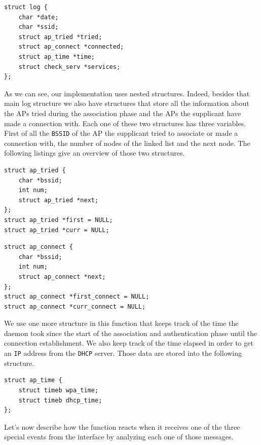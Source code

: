 \begin{lstlisting}[frame=single,breaklines=true,caption={Log structure}]
struct log {
	char *date;
	char *ssid;
	struct ap_tried *tried;
	struct ap_connect *connected;
	struct ap_time *time;
	struct check_serv *services;
};
\end{lstlisting}

As we can see, our implementation uses nested structures. Indeed, besides that main log structure we also have structures that store all the information about the APs tried during the association phase and the APs the supplicant have made a connection with. Each one of these two structures has three variables. First of all the \texttt{BSSID} of the AP the supplicant tried to associate or made a connection with, the number of nodes of the linked list and the next node. The following listings give an overview of those two structures.\\

\begin{lstlisting}[frame=single,breaklines=true,caption={Tried APs structure}]
struct ap_tried {
	char *bssid;
	int num;
	struct ap_tried *next;
};
struct ap_tried *first = NULL;
struct ap_tried *curr = NULL;
\end{lstlisting}

\begin{lstlisting}[frame=single,breaklines=true,caption={Connected APs structure}]
struct ap_connect {
	char *bssid;
	int num;
	struct ap_connect *next;
};
struct ap_connect *first_connect = NULL;
struct ap_connect *curr_connect = NULL;
\end{lstlisting}

We use one more structure in this function that keeps track of the time the daemon took since the start of the association and authentication phase until the connection establishment. We also keep track of the time elapsed in order to get an \texttt{IP} address from the \texttt{DHCP} server. Those data are stored into the following structure.\\

\begin{lstlisting}[frame=single,breaklines=true,caption={Elapsed time structure}]
struct ap_time {
	struct timeb wpa_time;
	struct timeb dhcp_time;
};
\end{lstlisting}

Let's now describe how the function reacts when it receives one of the three special events from the interface by analyzing each one of those messages.

